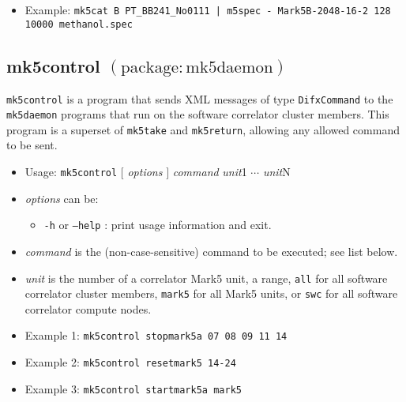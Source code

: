 \begin{itemize}
\item[] Example: {\tt mk5cat B PT\_BB241\_No0111 | m5spec - Mark5B-2048-16-2 128 10000 methanol.spec}
\end{itemize}






\subsection{mk5control {\small $\mathrm{(package: mk5daemon)}$}} \label{sec:mk5control} 

{\tt mk5control} is a program that sends XML messages of type {\tt DifxCommand} to the {\tt mk5daemon} programs that run on the software correlator cluster members.
This program is a superset of {\tt mk5take} and {\tt mk5return}, allowing any allowed command to be sent.

\begin{itemize}
\item[] Usage: {\tt mk5control} $[$ {\em options} $]$ {\em command} {\em unit}1 $\cdots$ {\em unit}N
\item[] {\em options} can be:
\begin{itemize}
\item[] {\tt -h} or {\tt --help} : print usage information and exit.
\end{itemize}
\item[] {\em command} is the (non-case-sensitive) command to be executed; see list below.
\item[] {\em unit} is the number of a correlator Mark5 unit, a range, {\tt all} for all software correlator cluster members, {\tt mark5} for all Mark5 units, or {\tt swc} for all software correlator compute nodes.
\item[] Example 1: {\tt mk5control stopmark5a 07 08 09 11 14}
\item[] Example 2: {\tt mk5control resetmark5 14-24} 
\item[] Example 3: {\tt mk5control startmark5a mark5}
\end{itemize}


